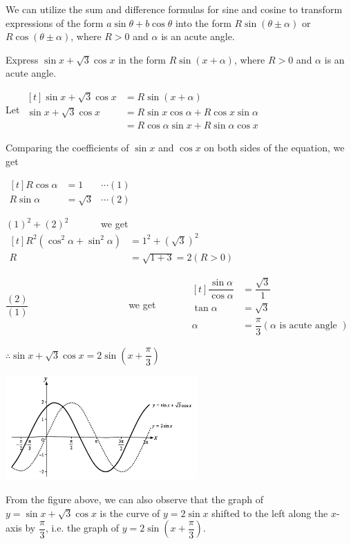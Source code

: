 \documentclass{report}
\begin{document}
\newpage
We can utilize the sum and difference formulas for sine and cosine to transform expressions of the form $a \sin \theta+b \cos \theta$ into the form $R \sin (\theta \pm \alpha)$ or $R \cos (\theta \pm \alpha)$, where $R>0$ and $\alpha$ is an acute angle.

\begin{question}
	Express $\sin x+\sqrt{3} \cos x$ in the form $R \sin (x+\alpha)$, where $R>0$ and $\alpha$ is an acute angle.
	
	\sol{}
	
	\noindent Let $\begin{aligned}[t] \sin x+\sqrt{3} \cos x & =R \sin (x+\alpha) \\ \sin x+\sqrt{3} \cos x & =R \sin x \cos \alpha+R \cos x \sin \alpha \\ & =R \cos \alpha \sin x+R \sin \alpha \cos x\end{aligned}$
	
	\noindent Comparing the coefficients of $\sin x$ and $\cos x$ on both sides of the equation, we get 
	    
	$\begin{aligned}[t] R \cos \alpha & =1 &\cdots (1) \\ R \sin \alpha & =\sqrt{3} &\cdots (2)\end{aligned}$
	
	\noindent $(1)^2+(2)^2$ \ \ \ \ \ \ we get \ \ \ \ \ \ $
	\begin{aligned}[t]
		R^2\left(\cos ^2 \alpha+\sin ^2 \alpha\right) & =1^2+(\sqrt{3})^2   \\
		R                                             & =\sqrt{1+3}=2 (R>0) 
	\end{aligned}
	$
	
	\noindent $\dfrac{(2)}{(1)}$ \ \ \ \ \ \ \ \ \ \ \ \ \ \ \ \ \ \ \ \ we get \ \ \ \ \ \ $\begin{aligned}[t]
	\dfrac{\sin \alpha}{\cos \alpha} & =\dfrac{\sqrt{3}}{1} \\
	\tan \alpha & =\sqrt{3} \\
	\alpha & =\dfrac{\pi}{3}(\alpha \text { is acute angle })
	\end{aligned}
	$
	
	\noindent $\therefore \sin x+\sqrt{3} \cos x=2 \sin \left(x+\dfrac{\pi}{3}\right)$
\end{question}
\vspace{-1.5em}
\begin{center}
	\includegraphics[width=0.55\textwidth]{assets/11-6.jpg}
\end{center}
\vspace{-2em}
From the figure above, we can also observe that the graph of $y=\sin x+\sqrt{3} \cos x$ is the curve of $y=2 \sin x$ shifted to the left along the $x$-axis by $\dfrac{\pi}{3}$, i.e. the graph of $y=2 \sin \left(x+\dfrac{\pi}{3}\right)$.
\end{document}
